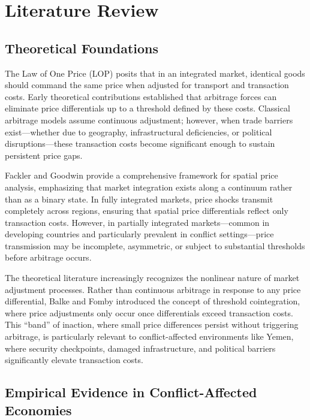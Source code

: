 \section{Literature Review}

\subsection{Theoretical Foundations}

The Law of One Price (LOP) posits that in an integrated market, identical goods should command the same price when adjusted for transport and transaction costs. Early theoretical contributions established that arbitrage forces can eliminate price differentials up to a threshold defined by these costs.\autocite{baulch1997, ravallion1986} Classical arbitrage models assume continuous adjustment; however, when trade barriers exist—whether due to geography, infrastructural deficiencies, or political disruptions—these transaction costs become significant enough to sustain persistent price gaps.

Fackler and Goodwin provide a comprehensive framework for spatial price analysis, emphasizing that market integration exists along a continuum rather than as a binary state.\autocite{fackler2001} In fully integrated markets, price shocks transmit completely across regions, ensuring that spatial price differentials reflect only transaction costs. However, in partially integrated markets—common in developing countries and particularly prevalent in conflict settings—price transmission may be incomplete, asymmetric, or subject to substantial thresholds before arbitrage occurs.

The theoretical literature increasingly recognizes the nonlinear nature of market adjustment processes. Rather than continuous arbitrage in response to any price differential, Balke and Fomby introduced the concept of threshold cointegration, where price adjustments only occur once differentials exceed transaction costs.\autocite{balke1997} This ``band'' of inaction, where small price differences persist without triggering arbitrage, is particularly relevant to conflict-affected environments like Yemen, where security checkpoints, damaged infrastructure, and political barriers significantly elevate transaction costs.

\subsection{Empirical Evidence in Conflict-Affected Economies}

